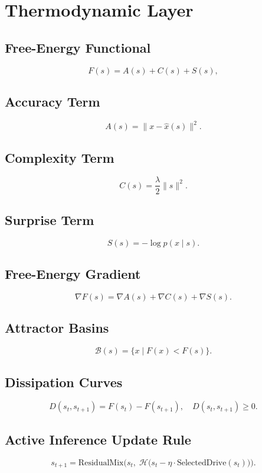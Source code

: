 \documentclass[11pt]{article}
\begin{document}
\section{Thermodynamic Layer}

\subsection{Free-Energy Functional}

\[
F(s) = A(s) + C(s) + S(s),
\]

\subsection{Accuracy Term}
\[
A(s) = \|x - \hat{x}(s)\|^2.
\]

\subsection{Complexity Term}
\[
C(s) = \frac{\lambda}{2} \|s\|^2.
\]

\subsection{Surprise Term}
\[
S(s) = -\log p(x \mid s).
\]

\subsection{Free-Energy Gradient}
\[
\nabla F(s) =
\nabla A(s) +
\nabla C(s) +
\nabla S(s).
\]

\subsection{Attractor Basins}
\[
\mathcal{B}(s) = \{ x \mid F(x) < F(s) \}.
\]

\subsection{Dissipation Curves}
\[
D(s_t, s_{t+1}) = F(s_t) - F(s_{t+1}),
\quad D(s_t, s_{t+1}) \ge 0.
\]

\subsection{Active Inference Update Rule}
\[
s_{t+1} =
\mathrm{ResidualMix}\Big(
    s_t,\;
    \mathcal{H}\big(
        s_t - \eta \cdot \mathrm{SelectedDrive}(s_t)
    \big)
\Big).
\]
\end{document}
